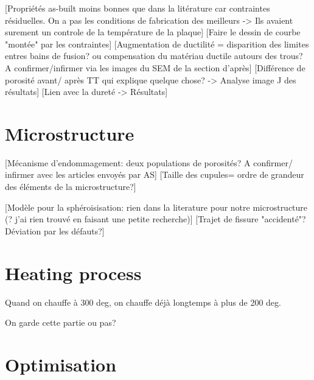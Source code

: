 [Propriétés as-built moins bonnes que dans la litérature car contraintes résiduelles. On a pas les conditions de fabrication des meilleurs -> Ils avaient surement un controle de la température de la plaque] 
[Faire le dessin de courbe "montée" par les contraintes]
[Augmentation de ductilité = disparition des	limites entres bains de fusion? ou compensation du matériau ductile autours des trous? A confirmer/infirmer via les images du SEM de la section d'après]
[Différence de porosité avant/ après TT qui explique quelque chose? -> Analyse image J des résultats]
[Lien avec la dureté -> Résultats]


\section{Microstructure}

[Mécanisme d'endommagement: deux populations de porosités? A confirmer/ infirmer avec les articles envoyés par AS]
[Taille des cupules= ordre de grandeur des éléments de la microstructure?] 

[Modèle pour la sphéroisisation: rien dans la literature pour notre microstructure (? j'ai rien trouvé en faisant une petite recherche)]
[Trajet de fissure "accidenté"? Déviation par les défauts?]

\section{Heating process}
Quand on chauffe à 300 deg, on chauffe déjà longtemps à plus de 200 deg.

 On garde cette partie ou pas?







\label{D-MP}

\section{Optimisation}



